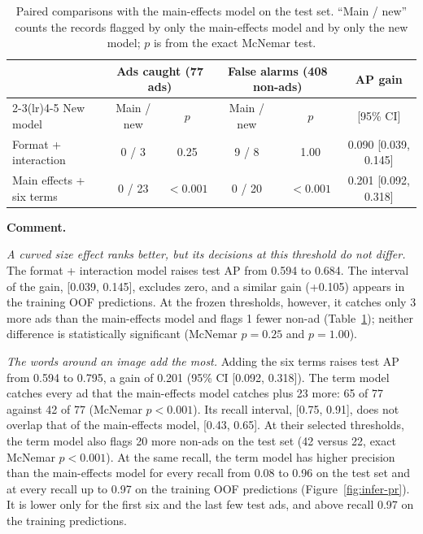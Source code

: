 

\begin{table}[htbp]
\centering
\small
\setlength{\tabcolsep}{4pt}
\caption{Paired comparisons with the main-effects model on the test set. ``Main / new'' counts the records flagged by only the main-effects model and by only the new model; $p$ is from the exact McNemar test.}
\label{tab:infer-paired}
\begin{tabular}{lccccc}
\toprule
& \multicolumn{2}{c}{Ads caught (77 ads)} & \multicolumn{2}{c}{False alarms (408 non-ads)} & AP gain\\
\cmidrule(lr){2-3}\cmidrule(lr){4-5}
New model & Main / new & $p$ & Main / new & $p$ & [95\% CI]\\
\midrule
Format + interaction & 0 / 3 & 0.25 & 9 / 8 & 1.00 & 0.090 [0.039, 0.145]\\
Main effects + six terms & 0 / 23 & $<0.001$ & 0 / 20 & $<0.001$ & 0.201 [0.092, 0.318]\\
\bottomrule
\end{tabular}
\end{table}

\textbf{Comment.}

\emph{A curved size effect ranks better, but its decisions at this threshold
do not differ.} The format + interaction model raises test AP from 0.594 to
0.684. The interval of the gain, [0.039, 0.145], excludes zero, and a similar
gain (+0.105) appears in the training OOF predictions. At the frozen
thresholds, however, it catches only 3 more ads than the main-effects model
and flags 1 fewer non-ad (Table~\ref{tab:infer-paired}); neither difference
is statistically significant (McNemar $p=0.25$ and $p=1.00$).

\emph{The words around an image add the most.} Adding the six terms raises
test AP from 0.594 to 0.795, a gain of 0.201 (95\% CI [0.092, 0.318]). The
term model catches every ad that the main-effects model catches plus 23 more:
65 of 77 against 42 of 77 (McNemar $p<0.001$). Its recall interval,
[0.75, 0.91], does not overlap that of the main-effects model,
[0.43, 0.65]. At their selected thresholds, the term model also flags
20 more non-ads on the test set (42 versus 22, exact McNemar $p<0.001$).
At the same recall, the term model has higher
precision than the main-effects model for every recall from 0.08 to 0.96 on
the test set and at every recall up to 0.97 on the training OOF predictions
(Figure~\ref{fig:infer-pr}). It is lower only for the first six and the
last few test ads, and above recall 0.97 on the training predictions.

